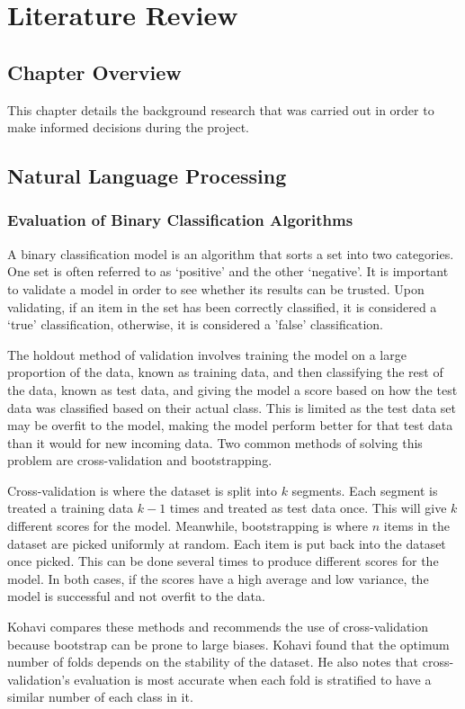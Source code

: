 \chapter{Literature Review}
	\section{Chapter Overview}
		This chapter details the background research that was carried out in order to make informed decisions during the project. 
	\section{Natural Language Processing}
		\subsection{Evaluation of Binary Classification Algorithms}\label{sec:eval-class}
			A binary classification model is an algorithm that sorts a set into two categories. One set is often referred to as `positive' and the other `negative'. It is important to validate a model in order to see whether its results can be trusted. Upon validating, if an item in the set has been correctly classified, it is considered a `true' classification, otherwise, it is considered a 'false' classification. 

			The holdout method of validation involves training the model on a large proportion of the data, known as training data, and then classifying the rest of the data, known as test data, and giving the model a score based on how the test data was classified based on their actual class\cite{cv_bootstrap_kohavi}. This is limited as the test data set may be overfit to the model, making the model perform better for that test data than it would for new incoming data. Two common methods of solving this problem are cross-validation and bootstrapping.  

			Cross-validation is where the dataset is split into $k$ segments. Each segment is treated a training data $k-1$ times and treated as test data once. This will give $k$ different scores for the model. Meanwhile, bootstrapping is where $n$ items in the dataset are picked uniformly at random. Each item is put back into the dataset once picked. This can be done several times to produce different scores for the model. In both cases, if the scores have a high average and low variance, the model is successful and not overfit to the data\cite{cv_bootstrap_kohavi}. 

			Kohavi compares these methods and recommends the use of cross-validation because bootstrap can be prone to large biases\cite{cv_bootstrap_kohavi}. Kohavi found that the optimum number of folds depends on the stability of the dataset. He also notes that cross-validation's evaluation is most accurate when each fold is stratified to have a similar number of each class in it. 

